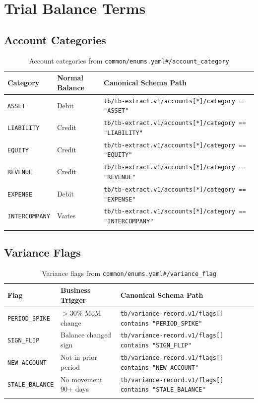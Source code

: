 \documentclass[11pt,a4paper]{report}
\newcommand{\schemapath}[1]{\texttt{\textcolor{pathcolor}{#1}}}
\newcommand{\enumval}[1]{\texttt{\textcolor{sapgreen}{#1}}}
\begin{document}
\chapter{Trial Balance Terms}

\section{Account Categories}

\begin{longtable}{@{}p{3cm}p{3.5cm}p{5.5cm}@{}}
\toprule
\textbf{Category} & \textbf{Normal Balance} & \textbf{Canonical Schema Path} \\
\midrule
\endhead
\enumval{ASSET} & Debit & \schemapath{tb/tb-extract.v1/accounts[*]/category == "ASSET"} \\
\enumval{LIABILITY} & Credit & \schemapath{tb/tb-extract.v1/accounts[*]/category == "LIABILITY"} \\
\enumval{EQUITY} & Credit & \schemapath{tb/tb-extract.v1/accounts[*]/category == "EQUITY"} \\
\enumval{REVENUE} & Credit & \schemapath{tb/tb-extract.v1/accounts[*]/category == "REVENUE"} \\
\enumval{EXPENSE} & Debit & \schemapath{tb/tb-extract.v1/accounts[*]/category == "EXPENSE"} \\
\enumval{INTERCOMPANY} & Varies & \schemapath{tb/tb-extract.v1/accounts[*]/category == "INTERCOMPANY"} \\
\bottomrule
\caption{Account categories from \schemapath{common/enums.yaml\#/account\_category}}
\end{longtable}

\section{Variance Flags}

\begin{longtable}{@{}p{3cm}p{3.5cm}p{5.5cm}@{}}
\toprule
\textbf{Flag} & \textbf{Business Trigger} & \textbf{Canonical Schema Path} \\
\midrule
\endhead
\enumval{PERIOD\_SPIKE} & $>$30\% MoM change & \schemapath{tb/variance-record.v1/flags[] contains "PERIOD\_SPIKE"} \\
\enumval{SIGN\_FLIP} & Balance changed sign & \schemapath{tb/variance-record.v1/flags[] contains "SIGN\_FLIP"} \\
\enumval{NEW\_ACCOUNT} & Not in prior period & \schemapath{tb/variance-record.v1/flags[] contains "NEW\_ACCOUNT"} \\
\enumval{STALE\_BALANCE} & No movement 90+ days & \schemapath{tb/variance-record.v1/flags[] contains "STALE\_BALANCE"} \\
\bottomrule
\caption{Variance flags from \schemapath{common/enums.yaml\#/variance\_flag}}
\end{longtable}
\end{document}
